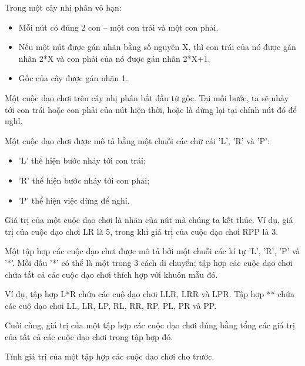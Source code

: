 Trong một cây nhị phân vô hạn:  
\begin{itemize}
	\item     Mỗi nút có đúng 2 con – một con trái và một con phải.   
	\item     Nếu một nút được gán nhãn bằng số nguyên X, thì con trái của nó được gán nhãn 2*X và con phải của nó được gán nhãn 2*X+1.   
	\item     Gốc của cây được gán nhãn 1.   
\end{itemize}

   Một  cuộc dạo chơi trên cây nhị phân bắt đầu từ gốc. Tại mỗi bước, ta sẽ nhảy tới con trái hoặc con phải của nút hiện thời, hoặc là dừng lại tại chính nút đó để nghỉ.  

   Một cuộc dạo chơi được mô tả bằng một chuỗi các chữ cái 'L', 'R' và 'P':  
\begin{itemize}
	\item     'L' thể hiện bước nhảy tới con trái;   
	\item     'R' thể hiện bước nhảy tới con phải;   
	\item     'P' thể hiện việc dừng để nghỉ.   
\end{itemize}

   Giá trị của một cuộc dạo chơi là nhãn của nút mà chúng ta kết thúc. Ví dụ, giá trị của cuộc dạo chơi LR là 5, trong khi giá trị của cuộc dạo chơi RPP là 3.  

   Một tập hợp các cuộc dạo chơi được mô tả bởi một chuỗi các kí tự 'L', 'R', 'P' và '*'. Mỗi dấu '*' có thể là một trong 3 cách di chuyển; tập hợp các cuộc dạo chơi chứa tất cả các cuộc dạo chơi thích hợp với khuôn mẫu đó.  

   Ví dụ, tập hợp L*R chứa các cuộ dạo chơi LLR, LRR và LPR. Tập hợp ** chứa các cuộ dạo chơi LL, LR, LP, RL, RR, RP, PL, PR và PP.  

   Cuối cùng, giá trị của một tập hợp các cuộc dạo chơi đúng bằng tổng các giá trị của tất cả các cuộc dạo chơi trong tập hợp đó.  

   Tính giá trị của một tập hợp các cuộc dạo chơi cho trước.